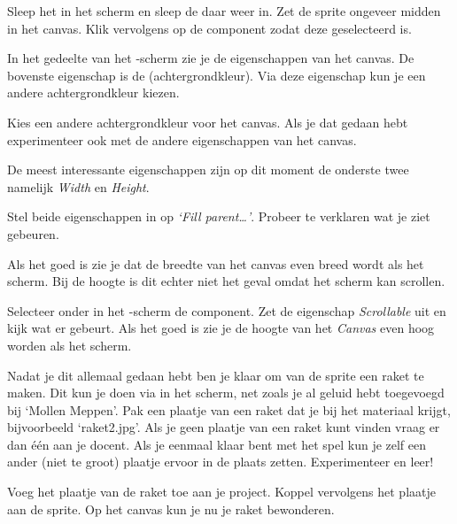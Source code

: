 \begin{opgave}
    \opgVraag
  Sleep het  in het scherm en sleep de  daar weer in. Zet de sprite ongeveer midden in het canvas. Klik vervolgens op de  component zodat deze geselecteerd is.
\end{opgave}

In het  gedeelte van het -scherm zie je de eigenschappen van het canvas. De bovenste eigenschap is de  (achtergrondkleur). Via deze eigenschap kun je een andere achtergrondkleur kiezen.

\begin{opgave}
    \opgVraag
  Kies een andere achtergrondkleur voor het canvas. Als je dat gedaan hebt experimenteer ook met de andere eigenschappen van het canvas.
\end{opgave}

De meest interessante eigenschappen zijn op dit moment de onderste twee namelijk \emph{Width} en \emph{Height}.

\begin{opgave}
    \opgVraag
  Stel beide eigenschappen in op \emph{`Fill parent\dots'}. Probeer te verklaren wat je ziet gebeuren.
\end{opgave}

Als het goed is zie je dat de breedte van het canvas even breed wordt als het scherm. Bij de hoogte is dit echter niet het geval omdat het scherm kan scrollen.

\begin{opgave}
    \opgVraag
  Selecteer onder  in het -scherm de  component. Zet de eigenschap \emph{Scrollable} uit en kijk wat er gebeurt. Als het goed is zie je de hoogte van het \emph{Canvas} even hoog worden als het scherm.
\end{opgave}

Nadat je dit allemaal gedaan hebt ben je klaar om van de sprite een raket te maken. Dit kun je doen via  in het  scherm, net zoals je al geluid hebt toegevoegd bij `Mollen Meppen'. Pak een plaatje van een raket dat je bij het materiaal krijgt, bijvoorbeeld `raket2.jpg'. Als je geen plaatje van een raket kunt vinden vraag er dan \'e\'en aan je docent. Als je eenmaal klaar bent met het spel kun je zelf een ander (niet te groot) plaatje ervoor in de plaats zetten. Experimenteer en leer!

\begin{opgave}
    \opgVraag
  Voeg het plaatje van de raket toe aan je project. Koppel vervolgens het plaatje aan de sprite. Op het canvas kun je nu je raket bewonderen.
\end{opgave}
 

